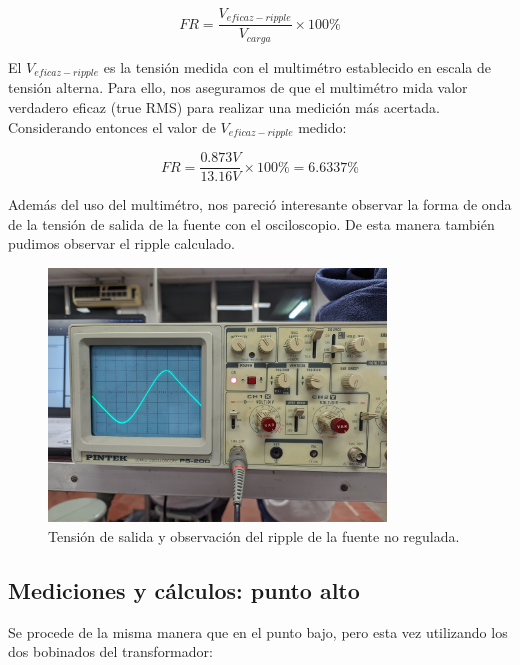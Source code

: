\documentclass[chaptersright]{informeutn}
\begin{document}
        \begin{equation*}
            FR = \frac{V_{eficaz-ripple}}{V_{carga}} \times 100\%
        \end{equation*}

        El $V_{eficaz-ripple}$ es la tensión medida con el multimétro establecido en escala de tensión alterna.
        Para ello, nos aseguramos de que el multimétro mida valor verdadero eficaz (true RMS) para realizar una
        medición más acertada. Considerando entonces el valor de $V_{eficaz-ripple}$ medido:

        \begin{equation*}
            FR = \frac{0.873V}{13.16V} \times 100\% = 6.6337\%
        \end{equation*}

        Además del uso del multimétro, nos pareció interesante observar la forma de onda de la tensión de salida de la
        fuente con el osciloscopio. De esta manera también pudimos observar el ripple calculado.
        \begin{figure}[h!]
          \centering
          \includegraphics[width=0.8\textwidth]{pictures/ripple_fuente-nreg.jpeg}
          \caption{Tensión de salida y observación del ripple de la fuente no regulada.}
        \end{figure}

        \subsection{Mediciones y cálculos: punto alto}
            Se procede de la misma manera que en el punto bajo, pero esta vez utilizando los dos bobinados del
            transformador:
\end{document}
